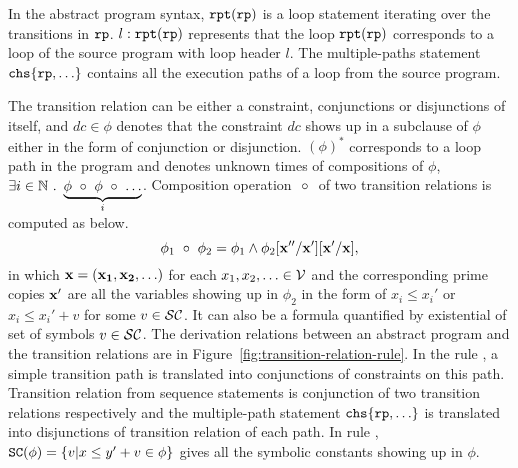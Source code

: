 In the abstract program syntax, $\mathtt{rpt}(\mathtt{rp})$ is a loop statement iterating over the transitions in $\mathtt{rp}$.
$l: \mathtt{rpt}(\mathtt{rp})$ represents that the loop $ \mathtt{rpt}(\mathtt{rp})$
corresponds to a loop of the source program with loop header $l$.
The multiple-paths statement $\rpchoose{\rprog, \ldots} $ contains all the execution paths of a loop from the source program.

The transition relation can be either a constraint, conjunctions or disjunctions of itself, and $dc \in \phi$ denotes that
the constraint $dc$ shows up in a subclause of $\phi$ either in the form of conjunction or disjunction.
$(\phi)^*$ corresponds to a loop path in the program and denotes unknown times of compositions of
$\phi$, $\exists i \in \mathbb{N} ~.~ \underbrace{\phi ~\circ~ \phi ~\circ~ \ldots}_{i} $.
Composition operation $~\circ~$ of two transition relations is computed as below.
\[
  \phi_1 ~\circ~ \phi_2 = \phi_1 \land \phi_2[\bf{}{x''}/\bf{}{x'}][\bf{}{x'}/{\bf{}{x}}],
\]
in which $\bf{}{x} = (x_1, x_2, \ldots)$ for each $x_1, x_2, \ldots \in \mathcal{V}$ and the corresponding prime copies $\bf{}{x'}$ are all the variables showing up in $\phi_2$ in the form of
$x_i \leq x_i'$ or $x_i \leq x_i' + v$ for some $v \in \mathcal{SC}$.
It can also be a formula quantified by existential of set of symbols $v \in \mathcal{SC}$.
The derivation relations between an abstract program and the transition relations are in Figure~\ref{fig:transition-relation-rule}.
In the rule , a simple transition path is translated into conjunctions of constraints on this path.
Transition relation from sequence statements is conjunction of two transition relations respectively and the multiple-path statement $\rpchoose{\rprog, \ldots} $ is translated into disjunctions of 
transition relation of each path.
In rule ,  $\scvar({\phi}) = \left\{ v \vert x \leq y' + v \in \phi \right\} $ gives all the symbolic constants showing up in $\phi$.

